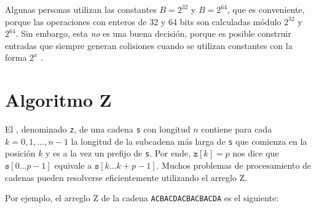 Algunas personas utilizan las constantes $B=2^{32}$ y $B=2^{64}$, que
es conveniente, porque las operaciones con enteros de 32 y 64 bits
son calculadas módulo $2^{32}$ y $2^{64}$. Sin embargo, esta \emph{no}
es una buena decisión, porque es posible construir entradas que siempre
generan colisiones cuando se utilizan constantes con la forma
$2^x$ \cite{pac13}.

\section{Algoritmo Z}


El , denominado \texttt{z}, de una cadena \texttt{s} con
longitud $n$ contiene para cada $k=0,1,\ldots,n-1$ la longitud de la
subcadena más larga de \texttt{s} que comienza en la posición $k$ y es
a la vez un prefijo de \texttt{s}. Por ende, $\texttt{z}[k]=p$ nos dice que
$\texttt{s}[0 \ldots p-1]$ equivale a $\texttt{s}[k \ldots k+p-1]$.
Muchos problemas de procesamiento de cadenas pueden resolverse
eficientemente utilizando el arreglo Z.

Por ejemplo, el arreglo Z de la cadena
\texttt{ACBACDACBACBACDA} es el siguiente:

